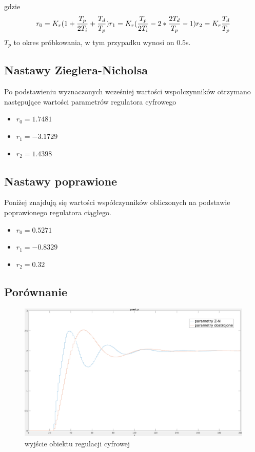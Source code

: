\documentclass[fleqn]{article}
\begin{document}
gdzie
{\Large
\begin{equation}
	r_0=K_r(1+\frac{T_p}{2T_i}+\frac{T_d}{T_p})\\
	r_1=K_r(\frac{T_p}{2T_i}-2*\frac{2T_d}{T_p}-1)\\
	r_2=K_r\frac{T_d}{T_p}
\end{equation}
}
$T_p$ to okres próbkowania, w tym przypadku wynosi on $0.5$s.
\pagebreak
\subsection{Nastawy Zieglera-Nicholsa}

Po podstawieniu wyznaczonych wcześniej wartości wspołczynników otrzymano następujące wartości parametrów regulatora cyfrowego
\begin{itemize}
	\item $r_0 = 1.7481$
	\item $r_1 = -3.1729$
	\item $r_2 = 1.4398$
\end{itemize}


\subsection{Nastawy poprawione}
Poniżej znajdują się wartości współczynników obliczonych na podstawie poprawionego regulatora ciągłego.
\begin{itemize}
	\item $r_0 = 0.5271$
	\item $r_1 = -0.8329$
	\item $r_2 = 0.32$
\end{itemize}

\subsection{Porównanie}
\begin{figure}[H]
	\includegraphics[width=\textwidth]{scripts/dyskretwyj.png}
	\caption{wyjście obiektu regulacji cyfrowej}
\end{figure}
\end{document}
